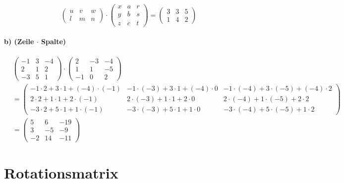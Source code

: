 \documentclass{article}
\begin{document}
$$ \begin{pmatrix} u & v & w \\ l & m & n \end{pmatrix} \cdot \begin{pmatrix} x & a & r \\ y & b & s \\ z & c & t \end{pmatrix} = \begin{pmatrix} 3 & 3 & 5 \\ 1 & 4 & 2 \end{pmatrix} $$

\paragraph{b) (Zeile $\cdot$ Spalte)}

\begin{align*}
    & \begin{pmatrix} -1 & 3 & -4 \\ 2 & 1 & 2 \\ -3 & 5 & 1 \end{pmatrix} \cdot \begin{pmatrix} 2 & -3 & -4 \\ 1 & 1 & -5 \\ -1 & 0 & 2 \end{pmatrix}\\
    & = \begin{pmatrix} 
    -1 \cdot 2 + 3 \cdot 1 + (-4) \cdot (-1) & -1 \cdot (-3) + 3 \cdot 1 + (-4) \cdot 0 & -1 \cdot (-4) + 3 \cdot (-5) + (-4) \cdot 2 \\ 
    2 \cdot 2 + 1 \cdot 1 + 2 \cdot (-1) & 2 \cdot (-3) + 1 \cdot 1 + 2 \cdot 0 & 2 \cdot (-4) + 1 \cdot (-5) + 2 \cdot 2 \\ 
    -3 \cdot 2 + 5 \cdot 1 + 1 \cdot (-1) & -3 \cdot (-3) + 5 \cdot 1 + 1 \cdot 0 & -3 \cdot (-4) + 5 \cdot (-5) + 1 \cdot 2 
    \end{pmatrix}\\
    & = \begin{pmatrix} 
    5 & 6 & -19 \\ 
    3 & -5 & -9 \\ 
    -2 & 14 & -11 
    \end{pmatrix}
\end{align*}

\section{Rotationsmatrix}
\end{document}
